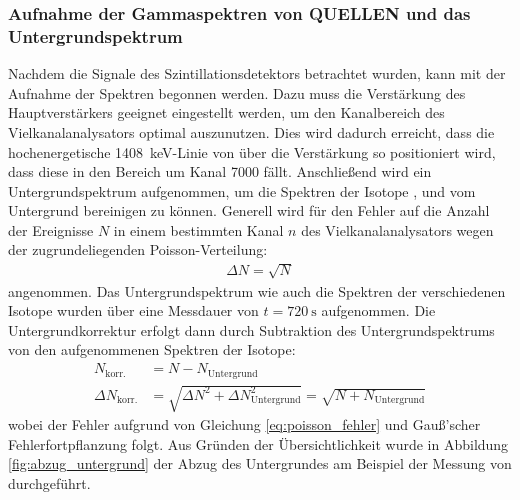 \documentclass[11pt, a4paper]{article}
\numberwithin{equation}{section}
\begin{document}
\subsubsection{Aufnahme der Gammaspektren von QUELLEN und das Untergrundspektrum}
Nachdem die Signale des Szintillationsdetektors betrachtet wurden, kann mit der Aufnahme der Spektren begonnen werden.
Dazu muss die Verstärkung des Hauptverstärkers geeignet eingestellt werden, um den Kanalbereich des Vielkanalanalysators optimal auszunutzen.
Dies wird dadurch erreicht, dass die hochenergetische \SI{1408}{keV}-Linie von  über die Verstärkung so positioniert wird, dass diese in den Bereich um Kanal 7000 fällt.
Anschließend wird ein Untergrundspektrum aufgenommen, um die Spektren der Isotope ,  und  vom Untergrund bereinigen zu können.
Generell wird für den Fehler auf die Anzahl der Ereignisse $N$ in einem bestimmten Kanal $n$ des Vielkanalanalysators wegen der zugrundeliegenden Poisson-Verteilung:
\begin{align}
\label{eq:poisson_fehler}
\Delta N = \sqrt{N}
\end{align}
angenommen.
Das Untergrundspektrum wie auch die Spektren der verschiedenen Isotope wurden über eine Messdauer von $t = \SI{720}{\second}$ aufgenommen.
Die Untergrundkorrektur erfolgt dann durch Subtraktion des Untergrundspektrums von den aufgenommenen Spektren der Isotope:
\begin{align}
	\label{eq:untergrundkorr_fehler}
	N_\mathrm{korr.} &= N - N_\mathrm{Untergrund}  \nonumber\\
	\Delta N_\mathrm{korr.} &= \sqrt{\Delta N^2 + \Delta N_\mathrm{Untergrund}^2} = \sqrt{N + N_\mathrm{Untergrund}}
\end{align}
wobei der Fehler aufgrund von Gleichung \ref{eq:poisson_fehler} und Gauß'scher Fehlerfortpflanzung folgt.
Aus Gründen der Übersichtlichkeit wurde in Abbildung \ref{fig:abzug_untergrund} der Abzug des Untergrundes am Beispiel der Messung von  durchgeführt.
\end{document}
